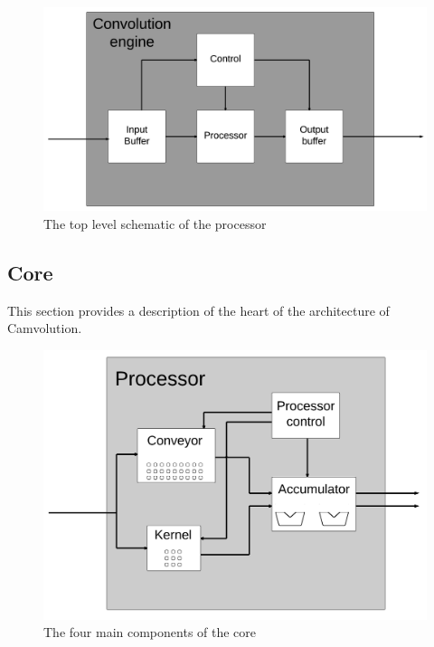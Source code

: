 \begin{figure}[h!]
    \includegraphics[width=\linewidth]{img/convolution_engine.png}
    \caption{The top level schematic of the processor}
    \label{fig:conv_engine}
\end{figure}

\subsection{Core}
This section provides a description of the heart of the architecture of Camvolution.

\begin{figure}[h!]
    \includegraphics[width=\linewidth]{img/processor_small.png}
    \caption{The four main components of the core}
    \label{fig:convolution_processor}
\end{figure}

